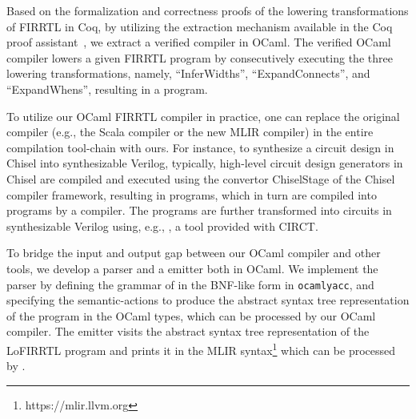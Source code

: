  
 
Based on the formalization and correctness proofs of the lowering transformations of FIRRTL in Coq,
by utilizing the extraction mechanism available in the Coq proof assistant~\cite{Letouzey02,LET08},
we extract a verified {\firrtl} compiler in OCaml. The verified OCaml compiler lowers
a given FIRRTL program by consecutively executing the three lowering transformations, namely,
``InferWidths'',
``ExpandConnects'', and ``ExpandWhens'', resulting in a {\lofirrtl} program.

To utilize our OCaml FIRRTL compiler in practice, one can replace the original {\firrtl} compiler (e.g., the Scala {\firrtl} compiler or
the new MLIR {\firrtl} compiler) in the entire compilation tool-chain with ours. For instance,
to synthesize a circuit design in Chisel into synthesizable Verilog,
typically, high-level circuit design generators in Chisel are compiled
and executed using the convertor \textsf{ChiselStage} of the Chisel compiler framework,
resulting in {\firrtl} programs, which in turn are compiled into {\lofirrtl} programs by a {\firrtl} compiler.
The {\lofirrtl} programs are further transformed into circuits in synthesizable Verilog using, e.g.,
{\firtool}, a tool provided with CIRCT.

To bridge the input and output gap between our OCaml {\firrtl} compiler and other tools, we develop
a {\firrtl} parser and a {\lofirrtl} emitter both in OCaml.
We implement the parser by defining the grammar of {\firrtl} in the BNF-like form in {\tt ocamlyacc}, and specifying the
semantic-actions to produce the abstract syntax tree representation of the {\firrtl} program in the OCaml types,
which can be processed by our OCaml {\firrtl} compiler.
The {\lofirrtl} emitter visits the abstract syntax tree representation of the LoFIRRTL program
and prints it in the MLIR syntax\footnote{https://mlir.llvm.org} which can be processed by {\firtool}.

